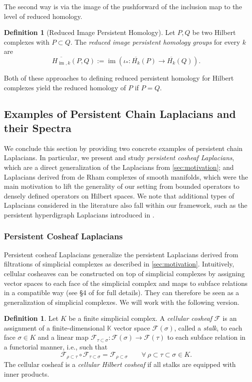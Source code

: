 \documentclass[11pt]{article}
\theoremstyle{definition}
\newtheorem{definition}[theorem]{Definition}
\theoremstyle{remark}
\DeclareMathOperator{\im}{im}
\newcommand{\Ff}{\mathcal{F}}
\newcommand{\IK}{\mathbb{K}}
\begin{document}
The second way is via the image of the pushforward of the inclusion map to the level of reduced homology.

\begin{definition}[Reduced Image Persistent Homology]
    Let $P,Q$ be two Hilbert complexes with $P \subset Q$. The \emph{reduced image persistent homology groups} for every $k$ are 
    $$
    \overline{H_{\im,k}}(P,Q) := \im(\iota_{*} : \overline{H_k}(P) \to \overline{H_k}(Q)).
    $$
\end{definition}

Both of these approaches to defining reduced persistent homology for Hilbert complexes yield the reduced homology of $P$ if $P=Q$.

\subsection{Examples of Persistent Chain Laplacians and their Spectra} \label{sub:examples}

We conclude this section by providing two concrete examples of persistent chain Laplacians. In particular, we present and study \emph{persistent cosheaf Laplacians}, which are a direct generalization of the Laplacians from \cref{sec:motivation}; and Laplacians derived from de Rham complexes of smooth manifolds, which were the main motivation to lift the generality of our setting from bounded operators to densely defined operators on Hilbert spaces. We note that additional types of Laplacians considered in the literature also fall within our framework, such as the persistent hyperdigraph Laplacians introduced in \citet{hyperdigraph}.

\subsubsection{Persistent Cosheaf Laplacians} \label{subsub:cosheaf}
Persistent cosheaf Laplacians generalize the persistent Laplacians derived from filtrations of simplicial complexes as described in \cref{sec:motivation}. Intuitively, cellular cosheaves can be constructed on top of simplicial complexes by assigning vector spaces to each face of the simplicial complex and maps to subface relations in a compatible way (see \S4 of \citet{curry} for full details). They can therefore be seen as a generalization of simplicial complexes. We will work with the following version.

\begin{definition}\textnormal{\citep[Cellular Cosheaf,][\S9.10]{ghrist}}
    Let $K$ be a finite simplicial complex. A \textit{cellular cosheaf} $\Ff$ is an assignment of a finite-dimensional $\IK$ vector space $\Ff(\sigma)$, called a \emph{stalk}, to each face $\sigma \in K$ and a linear map $\Ff_{\tau \subset \sigma}: \Ff(\sigma) \rightarrow \Ff(\tau)$ to each subface relation in a functorial manner, i.e., such that
    $$
        \Ff_{\rho \subset \tau} \circ \Ff_{\tau \subset \sigma}=\Ff_{\rho \subset \sigma} \qquad \forall\ \rho \subset \tau \subset \sigma \in K.
    $$
    The cellular cosheaf is a \emph{cellular Hilbert cosheaf} if all stalks are equipped with inner products.
\end{definition}
\end{document}
